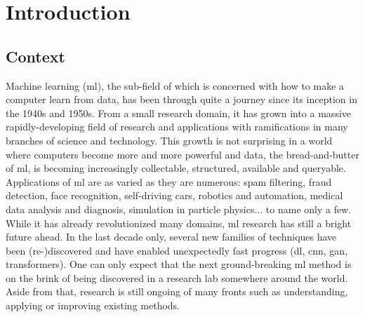 \chapter{Introduction}

\section{Context}

Machine learning (\acrshort{ml}), the sub-field of  which is concerned with how to make a computer learn from data, has been through quite a journey since its inception in the 1940s and 1950s. From a small research domain, it has grown into a massive rapidly-developing field of research and applications with ramifications in many branches of science and technology. This growth is not surprising in a world where computers become more and more powerful and data, the bread-and-butter of \acrlong{ml}, is becoming increasingly collectable, structured, available and queryable. Applications of \acrlong{ml} are as varied as they are numerous: spam filtering, fraud detection, face recognition, self-driving cars, robotics and automation, medical data analysis and diagnosis, simulation in particle physics... to name only a few. While it has already revolutionized many domains, \acrlong{ml} research has still a bright future ahead. In the last decade only, several new families of techniques have been (re-)discovered and have enabled unexpectedly fast progress (\eg \acrlong{dl}, \acrlong{cnn}, \acrlong{gan}, transformers). One can only expect that the next ground-breaking \acrshort{ml} method is on the brink of being discovered in a research lab somewhere around the world. Aside from that, research is still ongoing of many fronts such as understanding, applying or improving existing methods.

